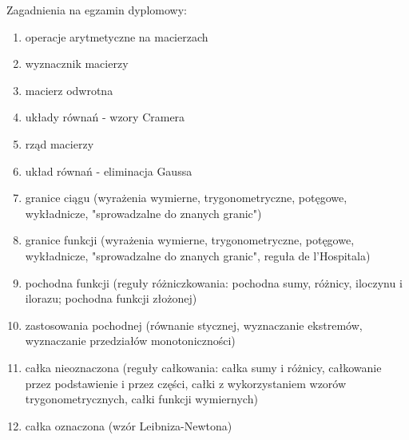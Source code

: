 \documentclass[12pt]{article}
\begin{document}
Zagadnienia na egzamin dyplomowy:
\begin{enumerate}
\item operacje arytmetyczne na macierzach
\item wyznacznik macierzy
\item macierz odwrotna
\item układy równań - wzory Cramera
\item rząd macierzy
\item układ równań - eliminacja Gaussa
\item granice ciągu (wyrażenia wymierne, trygonometryczne, potęgowe, wykładnicze, "sprowadzalne do znanych granic")
\item granice funkcji (wyrażenia wymierne, trygonometryczne, potęgowe, wykładnicze, "sprowadzalne do znanych granic", reguła de l'Hospitala)
\item pochodna funkcji (reguły różniczkowania: pochodna sumy, różnicy, iloczynu i ilorazu; pochodna funkcji złożonej)
\item zastosowania pochodnej (równanie stycznej, wyznaczanie ekstremów, wyznaczanie przedziałów monotoniczności)
\item całka nieoznaczona (reguły całkowania: całka sumy i różnicy, całkowanie przez podstawienie i przez części, całki z wykorzystaniem wzorów trygonometrycznych, całki funkcji wymiernych)
\item całka oznaczona (wzór Leibniza-Newtona)
\end{enumerate}
\end{document}
